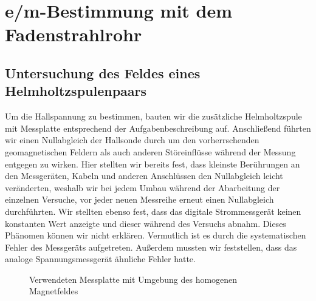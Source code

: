 \chapter{e/m-Bestimmung mit dem Fadenstrahlrohr}
\label{emBestimmung}
\section{Untersuchung des Feldes eines Helmholtzspulenpaars}
\label{HemholtzspulenpaarUntersuchung}
Um die Hallspannung zu bestimmen, bauten wir die zusätzliche Helmholtzspule mit Messplatte entsprechend der Aufgabenbeschreibung auf. Anschließend führten wir einen Nullabgleich der Hallsonde durch um den vorherrschenden geomagnetischen Feldern als auch anderen Störeinflüsse während der Messung entgegen zu wirken. Hier stellten wir bereits fest, dass kleinste Berührungen an den Messgeräten, Kabeln und anderen Anschlüssen den Nullabgleich leicht veränderten, weshalb wir bei jedem Umbau während der Abarbeitung der einzelnen Versuche, vor jeder neuen Messreihe erneut einen Nullabgleich durchführten. Wir stellten ebenso fest, dass das digitale Strommessgerät keinen konstanten Wert anzeigte und dieser während des Versuchs abnahm. Dieses Phänomen können wir nicht erklären. Vermutlich ist es durch die systematischen Fehler des Messgeräts aufgetreten. Außerdem mussten wir feststellen, dass das analoge Spannungsmessgerät ähnliche Fehler hatte.   

\begin{figure}[hbtp]
\centering
{}
\caption{Verwendeten Messplatte mit Umgebung des homogenen Magnetfeldes}
\label{fig:MessPlatte}
\end{figure}

